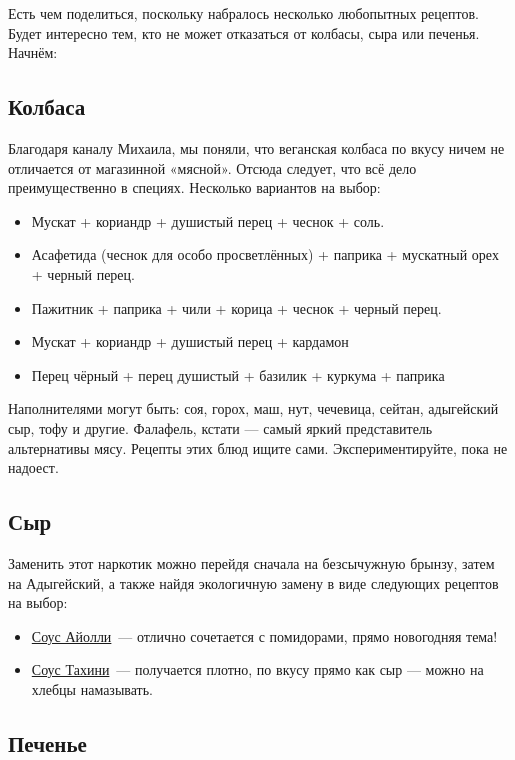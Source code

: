 Есть чем поделиться, поскольку набралось несколько любопытных рецептов. Будет интересно тем, кто не может отказаться от колбасы, сыра или печенья. Начнём:

\subsection{Колбаса}

Благодаря каналу Михаила, мы поняли, что веганская колбаса по вкусу ничем не отличается от магазинной «мясной». Отсюда следует, что всё дело преимущественно в специях. Несколько вариантов на выбор:

\begin{itemize}
\item Мускат + кориандр + душистый перец + чеснок + соль.
\item Асафетида (чеснок для особо просветлённых) + паприка + мускатный орех + черный перец.
\item Пажитник + паприка + чили + корица + чеснок + черный перец.
\item Мускат + кориандр + душистый перец + кардамон
\item Перец чёрный + перец душистый + базилик + куркума + паприка
\end{itemize}
Наполнителями могут быть: соя, горох, маш, нут, чечевица, сейтан, адыгейский сыр, тофу и другие. Фалафель, кстати — самый яркий представитель альтернативы мясу. Рецепты этих блюд ищите сами. Экспериментируйте, пока не надоест.

\subsection{Сыр}

Заменить этот наркотик можно перейдя сначала на безсычужную брынзу, затем на Адыгейский, а также найдя экологичную замену в виде следующих рецептов на выбор:
\begin{itemize}
    \item \hyperref[aiolli]{Соус Айолли}~---  отлично сочетается с помидорами, прямо новогодняя тема!

\item \hyperref[takini]{Соус Тахини}~--- получается плотно, по вкусу прямо как сыр — можно на хлебцы намазывать.
\end{itemize}


\subsection{Печенье}

